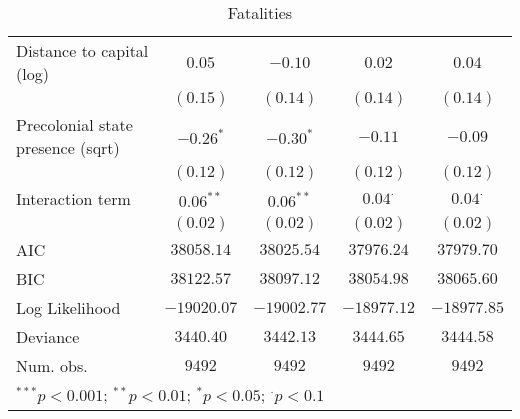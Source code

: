\begin{sidewaystable}
\begin{center}
{\begin{tabular}{l c c c c}
Distance to capital (log)                & $0.05$        & $-0.10$       & $0.02$         & $0.04$         \\
                                         & $(0.15)$      & $(0.14)$      & $(0.14)$       & $(0.14)$       \\
Precolonial state presence (sqrt)        & $-0.26^{*}$   & $-0.30^{*}$   & $-0.11$        & $-0.09$        \\
                                         & $(0.12)$      & $(0.12)$      & $(0.12)$       & $(0.12)$       \\
Interaction term                         & $0.06^{**}$   & $0.06^{**}$   & $0.04^{\cdot}$ & $0.04^{\cdot}$ \\
                                         & $(0.02)$      & $(0.02)$      & $(0.02)$       & $(0.02)$       \\
\midrule
AIC                                      & $38058.14$    & $38025.54$    & $37976.24$     & $37979.70$     \\
BIC                                      & $38122.57$    & $38097.12$    & $38054.98$     & $38065.60$     \\
Log Likelihood                           & $-19020.07$   & $-19002.77$   & $-18977.12$    & $-18977.85$    \\
Deviance                                 & $3440.40$     & $3442.13$     & $3444.65$      & $3444.58$      \\
Num. obs.                                & $9492$        & $9492$        & $9492$         & $9492$         \\
\bottomrule
\multicolumn{5}{l}{\scriptsize{$^{***}p<0.001$; $^{**}p<0.01$; $^{*}p<0.05$; $^{\cdot}p<0.1$}}
\end{tabular}
}
\caption{Fatalities}
\label{interaction_interdeaths}
\end{center}
\end{sidewaystable}
